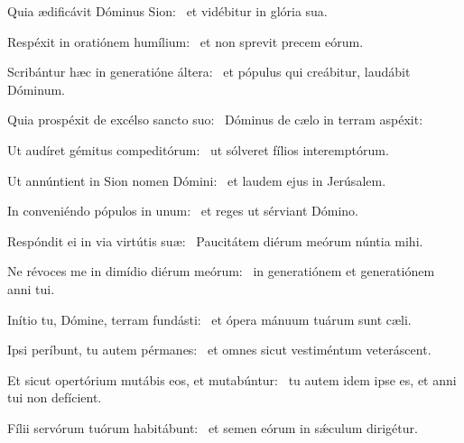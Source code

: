 \item Quia ædificávit Dóminus Sion:~\psstar{} et vidébitur in glória sua.

\item Respéxit in oratiónem humílium:~\psstar{} et non sprevit precem eórum.

\item Scribántur hæc in generatióne áltera:~\psstar{} et pópulus qui creábitur, laudábit Dóminum.

\item Quia prospéxit de excélso sancto suo:~\psstar{} Dóminus de cælo in terram aspéxit:

\item Ut audíret gémitus compeditórum:~\psstar{} ut sólveret fílios interemptórum.

\item Ut annúntient in Sion nomen Dómini:~\psstar{} et laudem ejus in Jerúsalem.

\item In conveniéndo pópulos in unum:~\psstar{} et reges ut sérviant Dómino.

\item Respóndit ei in via virtútis suæ:~\psstar{} Paucitátem diérum meórum núntia mihi.

\item Ne révoces me in dimídio diérum meórum:~\psstar{} in generatiónem et generatiónem anni tui.

\item Inítio tu, Dómine, terram fundásti:~\psstar{} et ópera mánuum tuárum sunt cæli.

\item Ipsi períbunt, tu autem pérmanes:~\psstar{} et omnes sicut vestiméntum veteráscent.

\item Et sicut opertórium mutábis eos, et mutabúntur:~\psstar{} tu autem idem ipse es, et anni tui non defícient.

\item Fílii servórum tuórum habitábunt:~\psstar{} et semen eórum in sǽculum dirigétur.